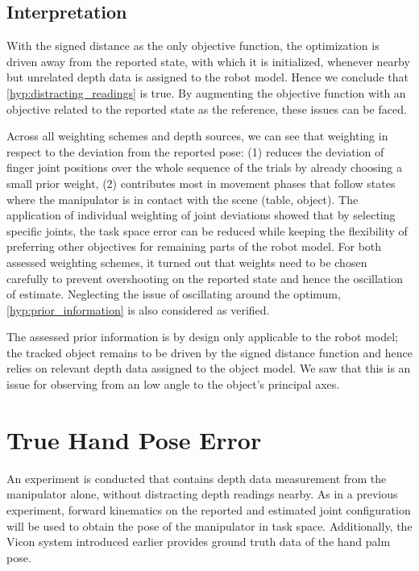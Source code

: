 \subsection{Interpretation}

With the signed distance as the only objective function, the optimization is driven away from the reported state, with which it is initialized, whenever nearby but unrelated depth data is assigned to the robot model. Hence we conclude that \cref{hyp:distracting_readings} is true. By augmenting the objective function with an objective related to the reported state as the reference, these issues can be faced.

Across all weighting schemes and depth sources, we can see that weighting in respect to the deviation from the reported pose: (1) reduces the deviation of finger joint positions over the whole sequence of the trials by already choosing a small prior weight, (2) contributes most in movement phases that follow states where the manipulator is in contact with the scene (table, object). The application of individual weighting of joint deviations showed that by selecting specific joints, the task space error can be reduced while keeping the flexibility of preferring other objectives for remaining parts of the robot model. For both assessed weighting schemes, it turned out that weights need to be chosen carefully to prevent overshooting on the reported state and hence the oscillation of estimate. Neglecting the issue of oscillating around the optimum, \cref{hyp:prior_information} is also considered as verified.

The assessed prior information is by design only applicable to the robot model; the tracked object remains to be driven by the signed distance function and hence relies on relevant depth data assigned to the object model. We saw that this is an issue for observing from an low angle to the object's principal axes.


\section{True Hand Pose Error}
\label{sec:hand_pose_error}

An experiment is conducted that contains depth data measurement from the manipulator alone, without distracting depth readings nearby. As in a previous experiment, forward kinematics on the reported and estimated joint configuration will be used to obtain the pose of the manipulator in task space. Additionally, the Vicon system introduced earlier provides ground truth data of the hand palm pose.



